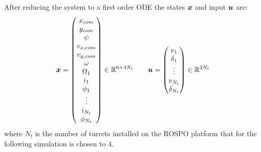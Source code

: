 After reducing the system to a first order ODE the states $\boldsymbol{x}$ and input $\boldsymbol{u}$ are:
\begin{equation} \label{eq:states}
\vett x =
\begin{pmatrix}
    x_{com} \\ y_{com} \\ \psi \\ v_{x,com} \\ v_{y, com} \\ \omega \\
    \Omega_{1} \\ i_{1} \\ \phi_{1} \\ \vdots \\ i_{N_{t}} \\ \phi_{N_{t}}
\end{pmatrix} \in \mathbb R^{6 + 3N_{t}}
\qquad \vett u =
\begin{pmatrix}
    v_{1} \\ \delta_{1} \\ \vdots \\ v_{N_{t}} \\ \delta_{N_{t}}
\end{pmatrix} \in \mathbb R^{2N_{t}}
\end{equation}
where $N_{t}$ is the number of turrets installed on the ROSPO platform that for the following simulation is chosen to $4$.

